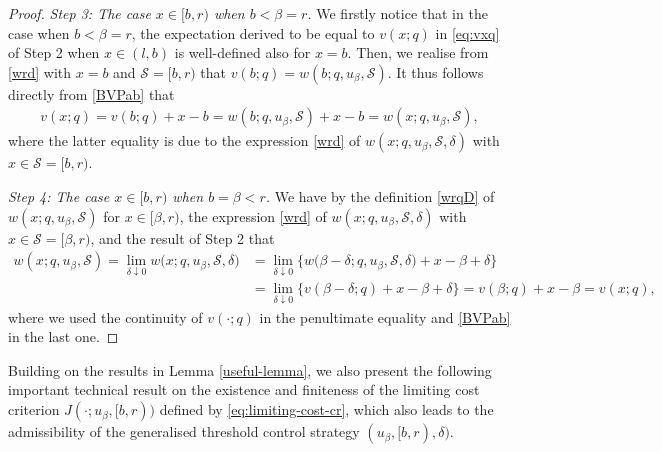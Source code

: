 \documentclass[11pt]{article} %
\numberwithin{komcounter}{section}
\begin{document}
\begin{proof}
\vspace{1mm}
{\it Step 3: The case $x\in [b,r)$ when $b<\beta=r$.} 
We firstly notice that in the case when $b<\beta=r$, the expectation derived to be equal to $v(x;q)$ in \eqref{eq:vxq} of Step 2 when $x\in(l,b)$ is well-defined also for $x=b$. 
Then, we realise from \eqref{wrd} with $x = b$ and $\mathcal{S}=[b,r)$ that  
$v(b;q) = w(b;q,u_\beta,\mathcal{S})$.
It thus follows directly from \eqref{BVPab} that
\begin{align*}
v(x;q) 
= v(b;q) + x - b 
= w(b;q,u_\beta,\mathcal{S}) 
+ x - b
= w(x;q,u_\beta,\mathcal{S}) ,
\end{align*}
where the latter equality is due to the expression \eqref{wrd} of $w(x;q,u_\beta,\mathcal{S},\delta)$ with $x \in \mathcal{S}=[b,r)$.

\vspace{1mm}
{\it Step 4: The case $x\in [b,r)$ when $b=\beta < r$.} 
We have by the definition \eqref{wrqD} of $w(x;q,u_\beta,\mathcal{S})$ for $x\in [\beta,r)$, the expression \eqref{wrd} of $w(x;q,u_\beta,\mathcal{S},\delta)$ with $x \in \mathcal{S}=[\beta,r)$,
and the result of Step 2 that
\begin{align*}
w(x;q,u_\beta,\mathcal{S}) 
= \lim_{\delta\downarrow 0} w\big(x;q,u_\beta,\mathcal{S},\delta\big)
&= \lim_{\delta\downarrow 0} \Big\{ w\big(\beta-\delta; q, u_\beta,\mathcal{S},\delta\big) + x - \beta + \delta \Big\}\\
&=\lim_{\delta\downarrow 0} \Big\{ v(\beta-\delta;q) + x - \beta + \delta \Big\} =v(\beta;q) + x - \beta 
= v(x;q),
\end{align*}
where we used the continuity of $v(\cdot;q)$ in the penultimate equality and \eqref{BVPab} in the last one.
\end{proof}

Building on the results in Lemma \ref{useful-lemma}, we also present the following important technical result on the existence and finiteness of the limiting cost criterion $J(\cdot;u_\beta,[b,r))$ defined by \eqref{eq:limiting-cost-cr}, which also leads to the admissibility of the generalised threshold control strategy $(u_\beta,[b,r),\delta)$.  
\end{document}
